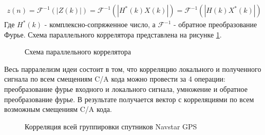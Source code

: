 \documentclass[a4paper,12pt]{article}
\numberwithin{table}{section}
\begin{document}
\begin{eqnarray}
	z(n)	= \mathcal{F}^{-1}(\left|{Z(k)}\right|)
		= \mathcal{F}^{-1}(\left|{H^*(k)X(k)}\right|)
		= \mathcal{F}^{-1}(\left|{H(k)X^*(k)}\right|)
\label{eq:par_corr}
\end{eqnarray}
Где ${H^*(k)}$ - комплексно-сопряженное число, а ${\mathcal{F}^{-1}}$ - обратное преобразование Фурье. Схема параллельного коррелятора
представлена на рисунке \ref{pic:par_corr}.
\begin{figure}[h]
\begin{center}
\end{center}
\caption{Схема параллельного коррелятора}
\label{pic:par_corr}
\end{figure}
Весь парралелизм идеи состоит в том, что корреляцию локального и полученного сигнала по всем смещениям C/A кода
можно провести за 4 операции: преобразование фурье входного и локального сигнала, умножение и обратное преобразование
фурье. В результате получается вектор с корреляциями по всем возможным смещениям C/A кода.

\begin{figure}[h]
\begin{center}
\end{center}
\caption{Корреляция всей группировки спутников Navstar GPS}
\label{pic:corr_bar}
\end{figure}
\end{document}
